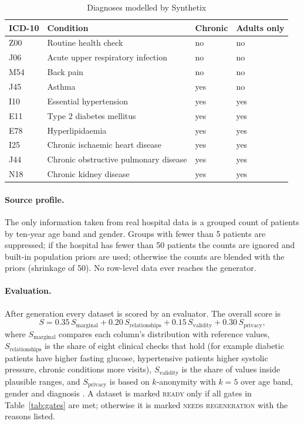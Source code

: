 \documentclass{tietreport}
\begin{document}
\begin{table}[H]
\centering
\small
\begin{tabular}{llll}
\toprule
\textbf{ICD-10} & \textbf{Condition} & \textbf{Chronic} & \textbf{Adults only} \\
\midrule
Z00 & Routine health check & no & no \\
J06 & Acute upper respiratory infection & no & no \\
M54 & Back pain & no & no \\
J45 & Asthma & yes & no \\
I10 & Essential hypertension & yes & yes \\
E11 & Type 2 diabetes mellitus & yes & yes \\
E78 & Hyperlipidaemia & yes & yes \\
I25 & Chronic ischaemic heart disease & yes & yes \\
J44 & Chronic obstructive pulmonary disease & yes & yes \\
N18 & Chronic kidney disease & yes & yes \\
\bottomrule
\end{tabular}
\caption{Diagnoses modelled by Synthetix}
\label{tab:icd}
\end{table}

\paragraph{Source profile.} The only information taken from real hospital
data is a grouped count of patients by ten-year age band and gender.
Groups with fewer than 5 patients are suppressed; if the hospital has fewer
than 50 patients the counts are ignored and built-in population priors are
used; otherwise the counts are blended with the priors (shrinkage of 50). No
row-level data ever reaches the generator.

\paragraph{Evaluation.} After generation every dataset is scored by an
evaluator. The overall score is
\[
  S = 0.35\,S_{\text{marginal}} + 0.20\,S_{\text{relationships}}
    + 0.15\,S_{\text{validity}} + 0.30\,S_{\text{privacy}},
\]
where $S_{\text{marginal}}$ compares each column's distribution with
reference values, $S_{\text{relationships}}$ is the share of eight clinical
checks that hold (for example diabetic patients have higher fasting glucose,
hypertensive patients higher systolic pressure, chronic conditions more
visits), $S_{\text{validity}}$ is the share of values inside plausible
ranges, and $S_{\text{privacy}}$ is based on $k$-anonymity with $k=5$ over
age band, gender and diagnosis \cite{sweeney2002}. A dataset is marked
\textsc{ready} only if all gates in Table~\ref{tab:gates} are met;
otherwise it is marked \textsc{needs regeneration} with the reasons listed.
\end{document}
